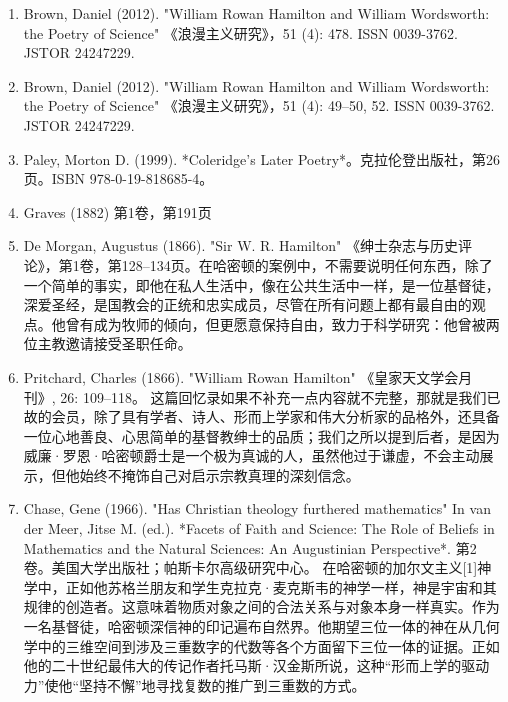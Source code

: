\begin{enumerate}
\item Brown, Daniel (2012). "William Rowan Hamilton and William Wordsworth: the Poetry of Science" 《浪漫主义研究》，51 (4): 478. ISSN 0039-3762. JSTOR 24247229.  
\item Brown, Daniel (2012). "William Rowan Hamilton and William Wordsworth: the Poetry of Science" 《浪漫主义研究》，51 (4): 49–50, 52. ISSN 0039-3762. JSTOR 24247229.  
\item Paley, Morton D. (1999). *Coleridge's Later Poetry*。克拉伦登出版社，第26页。ISBN 978-0-19-818685-4。  
\item Graves (1882) 第1卷，第191页  
\item De Morgan, Augustus (1866). "Sir W. R. Hamilton" 《绅士杂志与历史评论》，第1卷，第128–134页。在哈密顿的案例中，不需要说明任何东西，除了一个简单的事实，即他在私人生活中，像在公共生活中一样，是一位基督徒，深爱圣经，是国教会的正统和忠实成员，尽管在所有问题上都有最自由的观点。他曾有成为牧师的倾向，但更愿意保持自由，致力于科学研究：他曾被两位主教邀请接受圣职任命。
\item Pritchard, Charles (1866). "William Rowan Hamilton" 《皇家天文学会月刊》, 26: 109–118。  
这篇回忆录如果不补充一点内容就不完整，那就是我们已故的会员，除了具有学者、诗人、形而上学家和伟大分析家的品格外，还具备一位心地善良、心思简单的基督教绅士的品质；我们之所以提到后者，是因为威廉·罗恩·哈密顿爵士是一个极为真诚的人，虽然他过于谦虚，不会主动展示，但他始终不掩饰自己对启示宗教真理的深刻信念。
\item Chase, Gene (1966). "Has Christian theology furthered mathematics" In van der Meer, Jitse M. (ed.). *Facets of Faith and Science: The Role of Beliefs in Mathematics and the Natural Sciences: An Augustinian Perspective*. 第2卷。美国大学出版社；帕斯卡尔高级研究中心。  
在哈密顿的加尔文主义[1]神学中，正如他苏格兰朋友和学生克拉克·麦克斯韦的神学一样，神是宇宙和其规律的创造者。这意味着物质对象之间的合法关系与对象本身一样真实。作为一名基督徒，哈密顿深信神的印记遍布自然界。他期望三位一体的神在从几何学中的三维空间到涉及三重数字的代数等各个方面留下三位一体的证据。正如他的二十世纪最伟大的传记作者托马斯·汉金斯所说，这种“形而上学的驱动力”使他“坚持不懈”地寻找复数的推广到三重数的方式。  


\end{enumerate}
